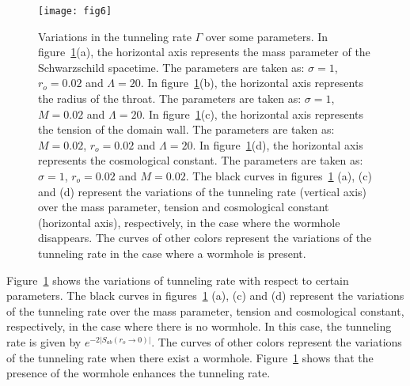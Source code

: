 \documentclass[12pt]{article}
\begin{document}
\begin{figure}[tbp]
\centering
\texttt{[image: fig6]}
\caption{\label{fig:10}Variations in the tunneling rate $\Gamma$ over some parameters. In figure~\ref{fig:10}(a), the horizontal axis represents the mass parameter of the Schwarzschild spacetime. The parameters are taken as: $\sigma=1$, $r_{o}=0.02$ and $\Lambda=20$. In figure~\ref{fig:10}(b), the horizontal axis represents the radius of the throat. The parameters are taken as: $\sigma=1$, $M=0.02$ and $\Lambda=20$. In figure~\ref{fig:10}(c), the horizontal axis represents the tension of the domain wall. The parameters are taken as: $M=0.02$, $r_{o}=0.02$ and $\Lambda=20$. In figure~\ref{fig:10}(d), the horizontal axis represents the cosmological constant. The parameters are taken as: $\sigma=1$, $r_{o}=0.02$ and $M=0.02$. The black curves in figures~\ref{fig:10} (a), (c) and (d) represent the variations of the tunneling rate (vertical axis) over the mass parameter, tension and cosmological constant (horizontal axis), respectively, in the case where the wormhole disappears. The curves of other colors represent the variations of the tunneling rate in the case where a wormhole is present.  }
\end{figure}


Figure~\ref{fig:10} shows the variations of tunneling rate with respect to certain parameters. The black curves in figures~\ref{fig:10} (a), (c) and (d) represent the variations of the tunneling rate  over the mass parameter, tension and cosmological constant, respectively, in the case where there is no wormhole. In this case, the tunneling rate is given by $e^{-2|S_{ab}(r_{o}\rightarrow 0)|}$. The curves of other colors represent the variations of the tunneling rate when there exist a wormhole. Figure~\ref{fig:10} shows that the presence of the wormhole enhances the tunneling rate.
\end{document}
